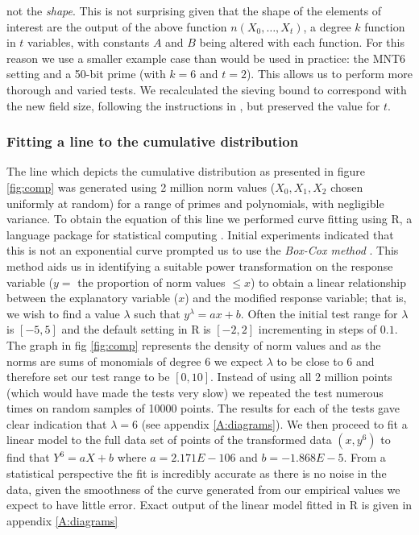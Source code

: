 \documentclass[a4paper, 12pt, envcountsect, runningheads]{llncs}
\numberwithin{figure}{section}
\numberwithin{equation}{section}
\begin{document}
not the \textit{shape}. This is not surprising given that the shape of the elements of interest are the output of the above function $n(X_0,\ldots,X_t)$, a degree $k$ function in $t$ variables, with constants $A$ and $B$ being altered with each function. For this reason we use a smaller example case than would be used in practice: the MNT6 setting and a 50-bit prime (with $k=6$ and $t=2$). This allows us to perform more thorough and varied tests. We recalculated the sieving bound to correspond with the new field size, following the instructions in \cite{joux-lercier-smart-vercauteren06}, but preserved the value for $t$.


\subsubsection*{Fitting a line to the cumulative distribution}
The line which depicts the cumulative distribution as presented in figure \ref{fig:comp} was generated using 2 million norm values ($X_0,X_1,X_2$ chosen uniformly at random) for a range of primes and polynomials, with negligible variance. To obtain the equation of this line we performed curve fitting using R, a language package for statistical computing \cite{R}. Initial experiments indicated that this is not an exponential curve prompted us to use the {\em Box-Cox method} \cite{box-cox}. This method aids us in identifying a suitable power transformation on the response variable ($y=$ the proportion of norm values $\leq x$) to obtain a linear relationship between the explanatory variable ($x$) and the modified response variable; that is, we wish to find a value $\lambda$ such that $y^\lambda=ax+b$. Often the initial test range for $\lambda$ is $[-5,5]$ and the default setting in R is $[-2,2]$ incrementing in steps of $0.1$. The graph in fig \ref{fig:comp} represents the density of norm values and as the norms are sums of monomials of degree 6 we expect $\lambda$ to be close to 6 and therefore set our test range to be $[0,10]$. Instead of using all 2 million points (which would have made the tests very slow) we repeated the test numerous times on random samples of 10000 points. The results for each of the tests gave clear indication that $\lambda=6$ (see appendix \ref{A:diagrams}). 
We then proceed to fit a linear model to the full data set of points of the transformed data $(x,y^6)$ to find that $Y^6=aX+b$ where $a=2.171E-106$ and $b=-1.868E-5$. From a statistical perspective the fit is incredibly accurate as there is no noise in the data, given the smoothness of the curve generated from our empirical values we expect to have little error. Exact output of the linear model fitted in R is given in appendix \ref{A:diagrams}
\end{document}
